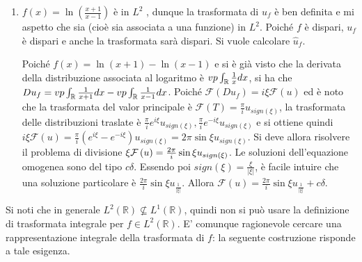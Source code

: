 \documentclass{article}
\begin{document}
\begin{enumerate}
\item $f\left( x\right) =\ln \left( \frac{x+1}{x-1}\right) $ \`{e} in $L^{2}$%
, dunque la trasformata di $u_{f}$ \`{e} ben definita e mi aspetto che sia
(cio\`{e} sia associata a una funzione) in $L^{2}$. Poich\'{e} $f$ \`{e}
dispari, $u_{f}$ \`{e} dispari e anche la trasformata sar\`{a} dispari. Si
vuole calcolare $\hat{u}_{f}$.

Poich\'{e} $f\left( x\right) =\ln \left( x+1\right) -\ln \left( x-1\right) $
e si \`{e} gi\`{a} visto che la derivata della distribuzione associata al
logaritmo \`{e} $vp\int_{%
\mathbb{R}
}\frac{1}{x}dx$, si ha che $Du_{f}=vp\int_{%
\mathbb{R}
}\frac{1}{x+1}dx-vp\int_{%
\mathbb{R}
}\frac{1}{x-1}dx$. Poich\'{e} $\mathcal{F}\left( Du_{f}\right) =i\xi 
\mathcal{F}\left( u\right) $ ed \`{e} noto che la trasformata del valor
principale \`{e} $\mathcal{F}\left( T\right) =\frac{\pi }{i}u_{sign\left(
\xi \right) }$, la trasformata delle distribuzioni traslate \`{e} $\frac{\pi 
}{i}e^{i\xi }u_{sign\left( \xi \right) },\frac{\pi }{i}e^{-i\xi
}u_{sign\left( \xi \right) }$ e si ottiene quindi $i\xi \mathcal{F}\left(
u\right) =\frac{\pi }{i}\left( e^{i\xi }-e^{-i\xi }\right) u_{sign\left( \xi
\right) }=2\pi \sin \xi u_{sign\left( \xi \right) }$. Si deve allora
risolvere il problema di divisione $\xi \mathcal{F}\left( u\right) =\frac{%
2\pi }{i}\sin \xi u_{sign\left( \xi \right) }$. Le soluzioni dell'equazione
omogenea sono del tipo $c\delta $. Essendo poi $sign\left( \xi \right) =%
\frac{\xi }{\left\vert \xi \right\vert }$, \`{e} facile intuire che una
soluzione particolare \`{e} $\frac{2\pi }{i}\sin \xi u_{\frac{1}{\left\vert
\xi \right\vert }}$. Allora $\mathcal{F}\left( u\right) =\frac{2\pi }{i}\sin
\xi u_{\frac{1}{\left\vert \xi \right\vert }}+c\delta $.
\end{enumerate}

Si noti che in generale $L^{2}\left( 
\mathbb{R}
\right) \not\subseteq L^{1}\left( 
\mathbb{R}
\right) $, quindi non si pu\`{o} usare la definizione di trasformata
integrale per $f\in L^{2}\left( 
\mathbb{R}
\right) $. E' comunque ragionevole cercare una rappresentazione integrale
della trasformata di $f$: la seguente costruzione risponde a tale esigenza.
\end{document}
